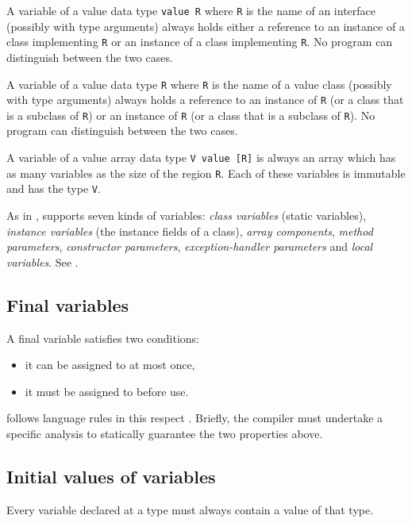 A variable of a value data type {\tt value R} where {\tt R} is the
name of an interface (possibly with type arguments) always holds
either a reference to an instance of a class implementing {\tt R} or
an instance of a class implementing {\tt R}. No program can
distinguish between the two cases.

A variable of a value data type {\tt R} where {\tt R} is the name of a
value class (possibly with type arguments) always holds a reference to
an instance of {\tt R} (or a class that is a subclass of {\tt R}) or
an instance of {\tt R} (or a class that is a subclass of {\tt R}). No
program can distinguish between the two cases.

A variable of a value array data type {\tt V value [R]} is always an
array which has as many variables as the size of the region {\tt R}.
Each of these variables is immutable and has the type {\tt V}.

As in \java, \Xten{} supports seven kinds of variables: {\em class
variables} (static variables), {\em instance variables} (the instance
fields of a class), {\em array components}, {\em method parameters},
{\em constructor parameters}, {\em exception-handler parameters} and
{\em local variables}. See \cite[\S 4.5.3]{jls2}.

\subsection{Final variables}\label{FinalVariable}
A final variable satisfies two conditions: 
\begin{itemize}
\item it can be assigned to at most once, 
\item it must be assigned to before use. 
\end{itemize}

\Xten{} follows \java{} language rules in this respect \cite[\S
4.5.4,8.3.1.2,16]{jls2}. Briefly, the compiler must undertake a
specific analysis to statically guarantee the two properties above.


\subsection{Initial values of variables}
\label{NullaryConstructor}
Every variable declared at a type must always contain a value of that type.

